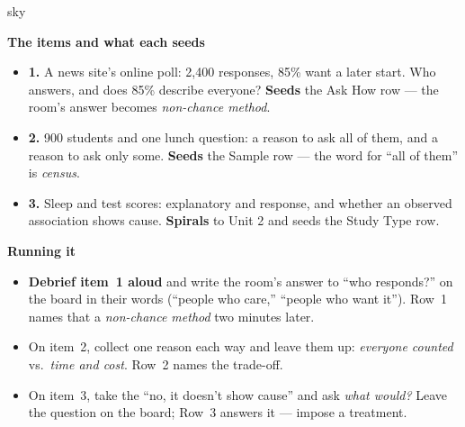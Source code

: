 \documentclass[10pt]{article}
\begin{document}
\boxguard[20]
\begin{skillbox}{sky}
\begin{minipage}[t]{0.48\linewidth}
    \textbf{The items and what each seeds}
    \begin{itemize}
        \item \textbf{1.} A news site's online poll: 2{,}400 responses, 85\% want a later
              start. Who answers, and does 85\% describe everyone? \textbf{Seeds} the Ask How
              row --- the room's answer becomes \emph{non-chance method}.
        \item \textbf{2.} 900 students and one lunch question: a reason to ask all of them,
              and a reason to ask only some. \textbf{Seeds} the Sample row --- the word for
              ``all of them'' is \emph{census}.
        \item \textbf{3.} Sleep and test scores: explanatory and response, and whether an
              observed association shows cause. \textbf{Spirals} to Unit 2 and seeds the
              Study Type row.
    \end{itemize}
\end{minipage}
\hfill
\begin{minipage}[t]{0.48\linewidth}
    \textbf{Running it}
    \begin{itemize}
        \item \textbf{Debrief item~1 aloud} and write the room's answer to ``who responds?'' on
              the board in their words (``people who care,'' ``people who want it''). Row~1
              names that a \emph{non-chance method} two minutes later.
        \item On item~2, collect one reason each way and leave them up: \emph{everyone counted}
              vs.\ \emph{time and cost}. Row~2 names the trade-off.
        \item On item~3, take the ``no, it doesn't show cause'' and ask \emph{what would?}
              Leave the question on the board; Row~3 answers it --- impose a treatment.
    \end{itemize}
\end{minipage}
\end{skillbox}
\end{document}

